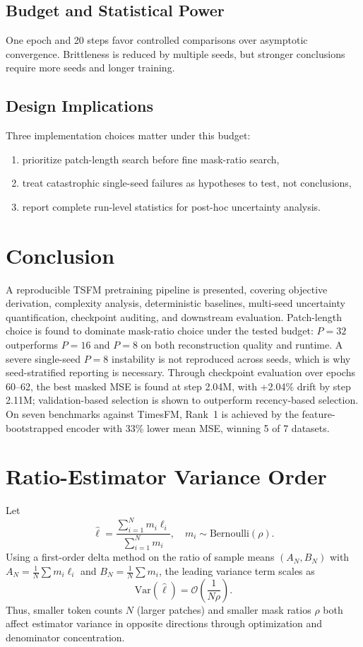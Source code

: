 \documentclass[journal]{IEEEtran}
\begin{document}
\subsection{Budget and Statistical Power}
One epoch and 20 steps favor controlled comparisons over asymptotic convergence. Brittleness is reduced by multiple seeds, but stronger conclusions require more seeds and longer training.

\subsection{Design Implications}
Three implementation choices matter under this budget:
\begin{enumerate}
    \item prioritize patch-length search before fine mask-ratio search,
    \item treat catastrophic single-seed failures as hypotheses to test, not conclusions,
    \item report complete run-level statistics for post-hoc uncertainty analysis.
\end{enumerate}

\section{Conclusion}
A reproducible TSFM pretraining pipeline is presented, covering objective derivation, complexity analysis, deterministic baselines, multi-seed uncertainty quantification, checkpoint auditing, and downstream evaluation. Patch-length choice is found to dominate mask-ratio choice under the tested budget: $P=32$ outperforms $P=16$ and $P=8$ on both reconstruction quality and runtime. A severe single-seed $P=8$ instability is not reproduced across seeds, which is why seed-stratified reporting is necessary. Through checkpoint evaluation over epochs 60--62, the best masked MSE is found at step 2.04M, with +2.04\% drift by step 2.11M; validation-based selection is shown to outperform recency-based selection. On seven benchmarks against TimesFM, Rank~1 is achieved by the feature-bootstrapped encoder with 33\% lower mean MSE, winning 5 of 7 datasets.

\appendices
\section{Ratio-Estimator Variance Order}
\label{app:ratio_var}
Let
\begin{equation}
\hat{\ell} = \frac{\sum_{i=1}^{N} m_i \ell_i}{\sum_{i=1}^{N} m_i}, \quad m_i\sim\mathrm{Bernoulli}(\rho).
\end{equation}
Using a first-order delta method on the ratio of sample means $(A_N,B_N)$ with $A_N=\frac{1}{N}\sum m_i\ell_i$ and $B_N=\frac{1}{N}\sum m_i$, the leading variance term scales as
\begin{equation}
\mathrm{Var}(\hat{\ell}) = \mathcal{O}\!\left(\frac{1}{N\rho}\right).
\label{eq:ratio_var_order}
\end{equation}
Thus, smaller token counts $N$ (larger patches) and smaller mask ratios $\rho$ both affect estimator variance in opposite directions through optimization and denominator concentration.
\end{document}
